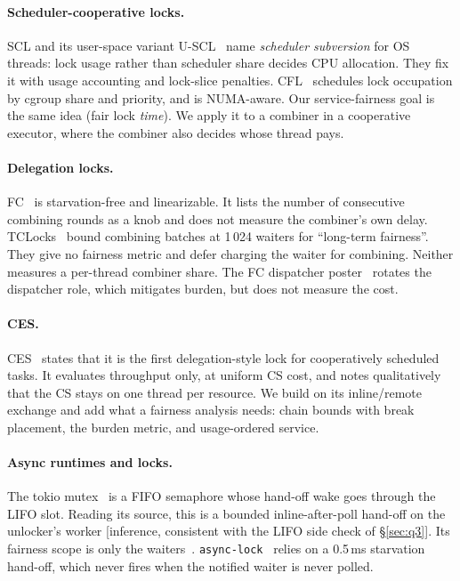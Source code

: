 \documentclass[10pt,twocolumn]{article}
\newcommand{\lk}[1]{\texttt{#1}}
\begin{document}
\paragraph{Scheduler-cooperative locks.} SCL and its user-space variant
U-SCL~\cite{scl} name \emph{scheduler subversion} for OS threads: lock usage
rather than scheduler share decides CPU allocation. They fix it with usage
accounting and lock-slice penalties. CFL~\cite{cfl} schedules lock occupation
by cgroup share and priority, and is NUMA-aware. Our service-fairness goal is
the same idea (fair lock \emph{time}). We apply it to a combiner in a
cooperative executor, where the combiner also decides whose thread pays.

\paragraph{Delegation locks.} FC~\cite{fc} is starvation-free and
linearizable. It lists the number of consecutive combining rounds as a knob
and does not measure the combiner's own delay. TCLocks~\cite{tclocks} bound
combining batches at 1\,024 waiters for ``long-term fairness''. They give no
fairness metric and defer charging the waiter for combining. Neither measures
a per-thread combiner share. The FC dispatcher poster~\cite{fcdispatch}
rotates the dispatcher role, which mitigates burden, but does not measure the
cost.

\paragraph{CES.} CES~\cite{ces} states that it is the first delegation-style
lock for cooperatively scheduled tasks. It evaluates throughput only, at
uniform CS cost, and notes qualitatively that the CS stays on one thread per
resource. We build on its inline/remote exchange and add what a fairness
analysis needs: chain bounds with break placement, the burden metric, and
usage-ordered service.

\paragraph{Async runtimes and locks.} The tokio mutex~\cite{tokio} is a
FIFO semaphore whose hand-off wake goes through the LIFO slot. Reading its
source, this is a bounded inline-after-poll hand-off on the unlocker's worker
[inference, consistent with the LIFO side check of \S\ref{sec:q3}]. Its fairness scope is only the waiters~\cite{tokio6049}.
\lk{async-lock}~\cite{asynclock} relies on a 0.5\,ms starvation hand-off,
which never fires when the notified waiter is never polled.
\end{document}
